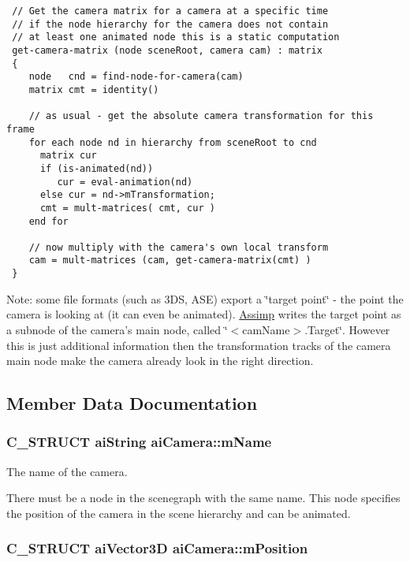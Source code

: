 \begin{Code}\begin{verbatim} // Get the camera matrix for a camera at a specific time
 // if the node hierarchy for the camera does not contain
 // at least one animated node this is a static computation
 get-camera-matrix (node sceneRoot, camera cam) : matrix
 {
    node   cnd = find-node-for-camera(cam)
    matrix cmt = identity()

    // as usual - get the absolute camera transformation for this frame
    for each node nd in hierarchy from sceneRoot to cnd
      matrix cur
      if (is-animated(nd))
         cur = eval-animation(nd)
      else cur = nd->mTransformation;
      cmt = mult-matrices( cmt, cur )
    end for

    // now multiply with the camera's own local transform
    cam = mult-matrices (cam, get-camera-matrix(cmt) )
 }
\end{verbatim}
\end{Code}



\begin{Desc}
\item[Note:]some file formats (such as 3DS, ASE) export a \char`\"{}target point\char`\"{} - the point the camera is looking at (it can even be animated). \hyperlink{namespace_assimp}{Assimp} writes the target point as a subnode of the camera's main node, called \char`\"{}$<$camName$>$.Target\char`\"{}. However this is just additional information then the transformation tracks of the camera main node make the camera already look in the right direction. \end{Desc}


\subsection{Member Data Documentation}
\hypertarget{structai_camera_a6a5fe5e04b3db1b23f69eb9910c6816}{
\subsubsection[mName]{\setlength{\rightskip}{0pt plus 5cm}C\_\-STRUCT {\bf aiString} {\bf aiCamera::mName}}}
\label{structai_camera_a6a5fe5e04b3db1b23f69eb9910c6816}


The name of the camera.

There must be a node in the scenegraph with the same name. This node specifies the position of the camera in the scene hierarchy and can be animated. \hypertarget{structai_camera_518617ea192ca0698e748a4399e7c3a5}{
\subsubsection[mPosition]{\setlength{\rightskip}{0pt plus 5cm}C\_\-STRUCT aiVector3D {\bf aiCamera::mPosition}}}
\label{structai_camera_518617ea192ca0698e748a4399e7c3a5}


